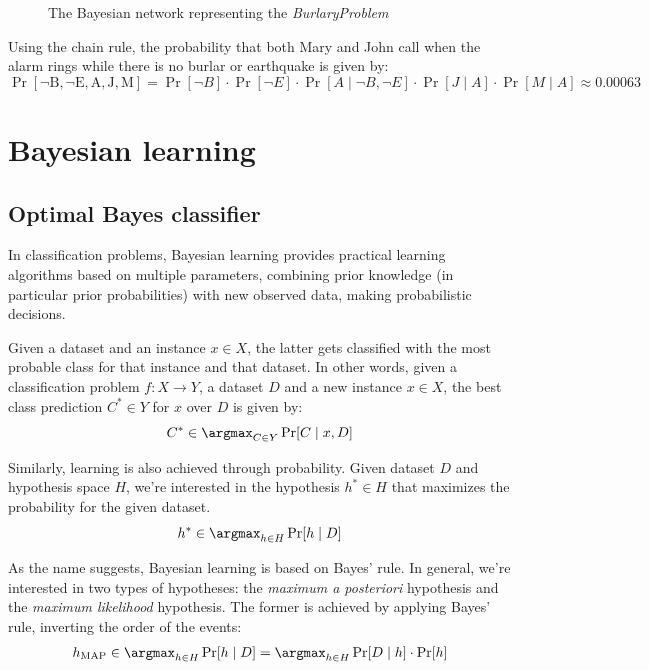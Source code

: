 \documentclass[a4paper, 12pt]{report}
\begin{document}
\begin{figure}[H]
{
        }
        \caption{The Bayesian network representing the \textit{BurlaryProblem}}
    \end{figure}

    Using the chain rule, the probability that both Mary and John call when the alarm rings while there is no burlar or earthquake is given by:
    \[\Pr[\mathrm{\lnot B, \lnot E, A, J, M}] = \Pr[\lnot B] \cdot \Pr[\lnot E] \cdot \Pr[A \mid \lnot B, \lnot E] \cdot \Pr[J \mid A] \cdot \Pr[M \mid A] \approx 0.00063\]
    
    \section{Bayesian learning}
    
    \subsection{Optimal Bayes classifier}

    In classification problems, Bayesian learning provides practical learning algorithms based on multiple parameters, combining prior knowledge (in particular prior probabilities) with new observed data, making probabilistic decisions.

    Given a dataset and an instance $x \in X$, the latter gets classified with the most probable class for that instance and that dataset. In other words, given a classification problem $f : X \to Y$, a dataset $D$ and a new instance $x \in X$, the best class prediction $C^* \in Y$ for $x$ over $D$ is given by:
    \[C^* \in \argmax_{C \in Y} \Pr[C \mid x, D]\]

    Similarly, learning is also achieved through probability. Given dataset $D$ and hypothesis space $H$, we're interested in the hypothesis $h^* \in H$ that maximizes the probability for the given dataset.
    \[h^* \in \argmax_{h \in H} \Pr[h \mid D]\]

    As the name suggests, Bayesian learning is based on Bayes' rule. In general, we're interested in two types of hypotheses: the \textit{maximum a posteriori} hypothesis and the \textit{maximum likelihood} hypothesis. The former is achieved by applying Bayes' rule, inverting the order of the events:
    \[\begin{split}
        h_{\mathrm{MAP}} \in \argmax_{h \in H} \Pr[h \mid D] = \argmax_{h \in H} \Pr[D \mid h] \cdot \Pr[h]\\
    \end{split}\]
\end{document}

